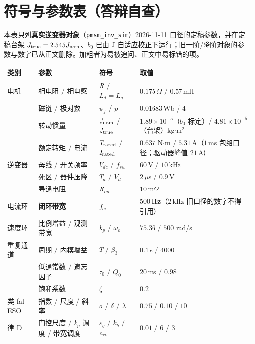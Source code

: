 \documentclass[11pt,a4paper]{article}
\theoremstyle{remark}\newtheorem{remark}{注}
\begin{document}
\section{符号与参数表（答辩自查）}\label{sec:sym}
本表只列\textbf{真实逆变器对象}（\texttt{pmsm\_inv\_sim}）2026-11-11 口径的定稿参数，并在定稿台架
$J_{\rm true}=2.545J_{\rm nom}$、$b_0$ 已由 J 自适应校正下运行；旧一阶/降阶对象的参数与数字已从正文删除。加粗者为易被追问、正文中易标错的项。

\begin{center}\scriptsize
\setlength{\tabcolsep}{2pt}
\begin{tabular}{@{}llll@{}}
\toprule
类别 & 参数 & 符号 & 取值\\
\midrule
电机 & 相电阻 / 相电感 & $R$ / $L_d=L_q$ & $0.175\,\Omega$ / $0.57$\,mH\\
 & 磁链 / 极对数 & $\psi_f$ / $p$ & $0.01683$\,Wb / $4$\\
 & 转动惯量 & $J_{\rm nom}$ / $J_{\rm true}$ & $1.89\times10^{-5}$（$b_0$ 标定）/ $4.81\times10^{-5}$（台架）kg$\cdot$m$^{2}$\\
 & 额定转矩 / 电流 & $T_{\rm rated}$ / $I_{\rm rated}$ & $0.637$ N$\cdot$m / $6.31$\,A（$1$\,ms 包络口径；驱动器峰值 $21$\,A）\\
\midrule
逆变器 & 母线 / 开关频率 & $V_{dc}$ / $f_{sw}$ & $60$\,V / $10$\,kHz\\
 & 死区 / 器件压降 & $T_d$ / $V_d$ & $2\,\mu$s / $0.9$\,V\\
 & 导通电阻 & $R_{on}$ & $10$\,m$\Omega$\\
\midrule
电流环 & \textbf{闭环带宽} & \textbf{$f_{ci}$} & \textbf{$500$\,Hz}（$2$\,kHz 旧口径的数字不得引用）\\
\midrule
速度环 & 比例增益 / 观测带宽 & $k_p$ / $\omega_o$ & $75.36$ / $500$ rad/s\\
\midrule
重复通道 & 周期 / 内模增益 & $T$ / $\beta_3$ & $0.1$\,s / $4000$\\
 & 低通常数 / 遗忘因子 & $\tau_0$ / $Q_0$ & $20$\,ms / $0.98$\\
 & 饱和系数 & $\zeta$ & $0.2$\\
\midrule
类 fal ESO & 指数 / 尺度 / 斜率 & $a$ / $\delta$ / $\lambda$ & $0.75$ / $0.10$ / $10$\\
\midrule
律 D & 门控尺度 / $k_p$ 调度 / 带宽调度 & $\varepsilon_g$ / $k_b$ / $a_{\rm es}$ & $0.01$ / $6$ / $3$\\
\midrule

\end{tabular}
\end{center}
\end{document}
